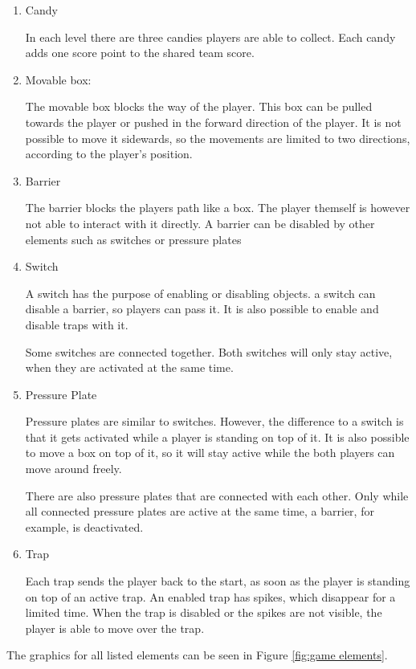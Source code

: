 \begin{enumerate}
    \item Candy
    
    In each level there are three candies players are able to collect. Each candy adds one score point to the shared team score.
    \item Movable box:   
    
    The movable box blocks the way of the player. This box can be pulled towards the player or pushed in the forward direction of the player. It is not possible to move it sidewards, so the movements are limited to two directions, according to the player's position.
    \item Barrier
    
    The barrier blocks the players path like a box. The player themself is however not able to interact with it directly. A barrier can be disabled by other elements such as switches or pressure plates
    \item Switch
    
    A switch has the purpose of enabling or disabling objects. a switch can disable a barrier, so players can pass it.
    It is also possible to enable and disable traps with it.
    
    Some switches are connected together. Both switches will only stay active, when they are activated at the same time.
    \item Pressure Plate
    
    Pressure plates are similar to switches. However, the difference to a switch is that it gets activated while a player is standing on top of it. It is also possible to move a box on top of it, so it will stay active while the both players can move around freely.
    
    There are also pressure plates that are connected with each other. Only while all connected pressure plates are active at the same time, a barrier, for example, is deactivated.
    \item Trap
    
    Each trap sends the player back to the start, as soon as the player is standing on top of an active trap. An enabled trap has spikes, which disappear for a limited time. When the trap is disabled or the spikes are not visible, the player is able to move over the trap.
\end{enumerate}

The graphics for all listed elements can be seen in Figure \ref{fig:game elements}.

